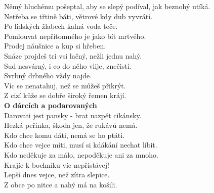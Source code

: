 \begin{multicols}{2}
Němý hluchému pošeptal, aby se slepý podíval, jak beznohý utíká.\\
Netřeba se třtině báti, větrové kdy dub vyvrátí.\\
Po lidských žlabech kalná voda teče.\\
Pomlouvat nepřítomného je jako bít mrtvého.\\
Prodej náušnice a kup si hřeben.\\
Snáze projdeš tri vsi lačný, nežli jednu nahý.\\
Sud nesvárný, i co do něho vlije, znečistí.\\
Svrbný drbného vždy najde.\\
Víc se nenatahuj, než se můžeš přikrýt.\\
Z cizí kůže se dobře široký řemen krájí.\\

\noindent
{\large\bf O dárcích a podarovaných}\\[1 mm]
Darovati jest pansky - brat nazpět cikánsky.\\
Hezká peřinka, škoda jen, že rukávů nemá.\\
Kdo chce komu dáti, nemá se ho ptáti.\\
Kdo chce vejce míti, musí si kdákání nechat líbit.\\
Kdo neděkuje za málo, nepoděkuje ani za mnoho.\\
Krajíc k bochníku víc nepřistávej!\\
Lepší dnes vejce, než zítra slepice.\\
Z obce po nitce a nahý má na košili.\\


\end{multicols}

